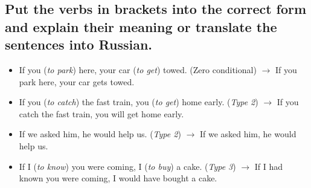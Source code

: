 \subsection*{Put the verbs in brackets into the correct form and explain their meaning or translate the
      sentences into Russian.}
\begin{itemize}
      \item If you (\textit{to park}) here, your car (\textit{to get}) towed. (Zero conditional) $\rightarrow$ If you park here, your car gets towed.
      \item If you (\textit{to catch}) the fast train, you (\textit{to get}) home early. (\textit{Type 2}) $\rightarrow$ If you catch the fast train, you will get home early.
      \item If we asked him, he would help us. (\textit{Type 2}) $\rightarrow$ If we asked him, he would help us.
      \item If I (\textit{to know}) you were coming, I (\textit{to buy}) a cake. (\textit{Type 3}) $\rightarrow$ If I had known you were coming, I would have bought a cake.
\end{itemize}

